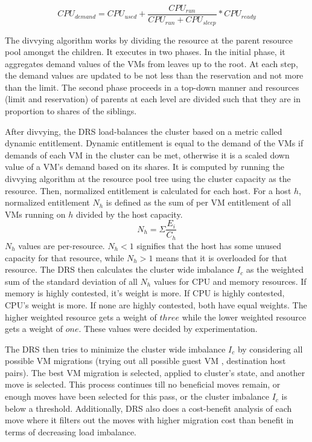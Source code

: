 $$ CPU_{demand} = CPU_{used} + \frac{CPU_{run}}{CPU_{run}+CPU_{sleep}}*CPU_{ready}$$

The divvying algorithm works by dividing the resource at the parent resource pool amongst the children. It executes in two phases. In the initial phase, it aggregates demand values of the VMs from leaves up to the root. At each step, the demand values are updated to be not less than the reservation and not more than the limit. The second phase proceeds in a top-down manner and resources (limit and reservation) of parents at each level are divided such that they are in proportion to shares of the siblings. 

After divvying, the DRS load-balances the cluster based on a metric called dynamic entitlement. Dynamic entitlement is equal to the demand of the VMs if demands of each VM in the cluster can be met, otherwise it is a scaled down value of a VM’s demand based on its shares. It is computed by running the divvying algorithm at the resource pool tree using the cluster capacity as the resource. Then, normalized entitlement is calculated for each host. For a host $h$, normalized entitlement $N_h$
 is defined as the sum of per VM entitlement of all VMs running on $h$ divided by the host capacity.
 $$N_h = \Sigma \frac{E_i}{C_h}$$
 $N_h$ values are per-resource. $N_h < 1$ signifies that the host has some unused capacity for that resource, while $N_h > 1$ means that it is overloaded for that resource. The DRS then calculates the cluster wide imbalance $I_c$ as the weighted sum of the standard deviation of all $N_h$ values for CPU and memory resources. If memory is highly contested, it's weight is more. If CPU is highly contested, CPU's weight is more. If none are highly contested, both have equal weights. The higher weighted resource gets a weight of $three$ while the lower weighted resource gets a weight of $one$. These values were decided by experimentation.

The DRS then tries to minimize the cluster wide imbalance $I_c$ by considering all possible VM migrations (trying out all possible guest VM , destination host pairs). The best VM migration is selected, applied to cluster’s state, and another move is selected. This process continues till no beneficial moves remain, or enough moves have been selected for this pass, or the cluster imbalance $I_c$ is below a threshold. Additionally, DRS also does a cost-benefit analysis of each move where it filters out the moves with higher migration cost than benefit in terms of decreasing load imbalance.

